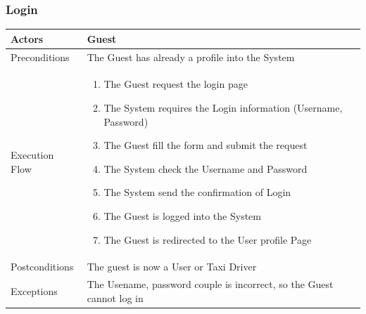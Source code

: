 \documentclass[english]{article}
\begin{document}
\subsubsection{Login}

\begin{tabular}{lp{8cm}}
\hline
Actors & Guest \\
\hline
Preconditions &   The Guest has already a profile into the System\\
\hline
Execution Flow &  
		\begin{enumerate}
			\item The Guest request the login page
			\item The System requires the Login information (Username, Password)
			\item The Guest fill the form and submit the request
			\item The System check the Username and Password
			\item The System send the confirmation of Login
			\item The Guest is logged into the System
			\item The Guest is redirected to the User profile Page
		\end{enumerate} 
	\\ 
\hline
Postconditions & The guest is now a User or Taxi Driver \\
\hline
Exceptions & The Usename, password couple is incorrect, so the Guest cannot log in
\end{tabular}
\end{document}
